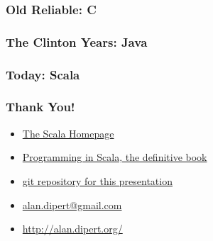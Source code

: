 \documentclass[hyperref={colorlinks=true}]{beamer}
\begin{document}
\begin{frame} 
\frametitle{Old Reliable: C}
\tt\tiny{

}
\end{frame} 

\begin{frame} 
\frametitle{The Clinton Years: Java}
\tt\tiny{

}
\end{frame} 

\begin{frame} 
\frametitle{Today: Scala}
\tt\tiny{

}
\end{frame} 

\begin{frame} 
\frametitle{Thank You!}
\begin{itemize}
  \item<1-> \href{http://www.scala-lang.org/}{The Scala Homepage}
  \item<1-> \href{http://www.artima.com/shop/programming_in_scala}{Programming in Scala, the definitive book}
  \item<1-> \href{http://github.com/alandipert/scala-presentation/tree/master}{git repository for this presentation}
\end{itemize}
\begin{itemize}
  \item<1-> \href{mailto:alan.dipert@gmail.com}{alan.dipert@gmail.com}
  \item<1-> \href{http://alan.dipert.org/}{http://alan.dipert.org/}
\end{itemize}
\end{frame} 
\end{document}
